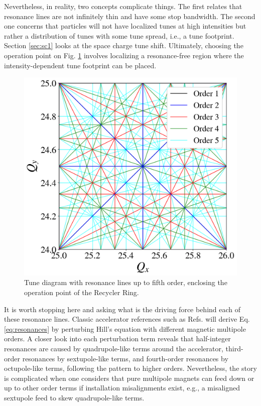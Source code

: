 Nevertheless, in reality, two concepts complicate things. The first relates that resonance lines are not infinitely thin and have some stop bandwidth. The second one concerns that particles will not have localized tunes at high intensities but rather a distribution of tunes with some tune spread, i.e., a tune footprint. Section \ref{sec:sc1} looks at the space charge tune shift. Ultimately, choosing the operation point on Fig. \ref{fig:tunediagram} involves localizing a resonance-free region where the intensity-dependent tune footprint can be placed.   
\begin{figure}[H]
    \centering
    \includegraphics[width=0.8\columnwidth]{chapter2/tunediagram.png}
    \caption{Tune diagram with resonance lines up to fifth order, enclosing the operation point of the Recycler Ring.}
    \label{fig:tunediagram}
 \end{figure}
It is worth stopping here and asking what is the driving force behind each of these resonance lines. Classic accelerator references such as Refs. \cite{wolski,Wiedemann2015,sylee} will derive Eq. \ref{eq:resonances} by perturbing Hill's equation with different magnetic multipole orders. A closer look into each perturbation term reveals that half-integer resonances are caused by quadrupole-like terms around the accelerator, third-order resonances by sextupole-like terms, and fourth-order resonances by octupole-like terms, following the pattern to higher orders. Nevertheless, the story is complicated when one considers that pure multipole magnets can feed down or up to other order terms if installation misalignments exist, e.g., a misaligned sextupole feed to skew quadrupole-like terms.        

